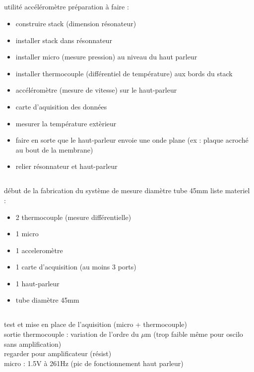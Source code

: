 \documentclass[11pt,a4paper]{article}
\begin{document}
	\subsection{}
		utilité accéléromètre
		préparation à faire :
		\begin{itemize}		
			\item construire stack (dimension résonateur)
			\item installer stack dans résonnateur
			\item installer micro (mesure pression) au niveau du haut parleur
			\item installer thermocouple (différentiel de température) aux bords du stack
			\item accéléromètre (mesure de vitesse) sur le haut-parleur
			\item carte d'aquisition des données
			\item mesurer la température extèrieur
			\item faire en sorte que le haut-parleur envoie une onde plane (ex : plaque acroché au bout de la membrane)
			\item relier résonnateur et haut-parleur
		\end{itemize}
		
	\subsection{}
		début de la fabrication du système de mesure
		diamètre tube 45mm
		liste materiel :
		\begin{itemize}		
			\item 2 thermocouple (mesure différentielle)
			\item 1 micro
			\item 1 acceleromètre 
			\item 1 carte d'acquisition (au moins 3 ports)
			\item 1 haut-parleur 
			\item tube diamètre 45mm
		\end{itemize}
		
	\subsection{}
		test et mise en place de l'aquisition (micro + thermocouple)\\
		sortie thermocouple : variation de l'ordre du $\mu$m (trop faible même pour oscilo sans amplification)\\
		regarder pour amplificateur (résist)\\
		micro : 1.5V à 261Hz (pic de fonctionnement haut parleur)\\
		
\end{document}
